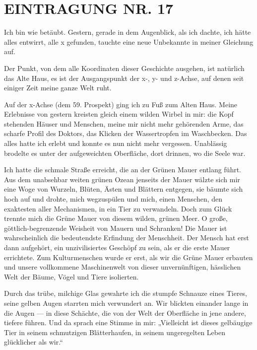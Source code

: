 \section{EINTRAGUNG NR. 17}

Ich bin wie betäubt. Gestern, gerade in dem Augenblick, als ich
dachte, ich hätte alles entwirrt, alle x gefunden, tauchte eine
neue Unbekannte in meiner Gleichung auf.

Der Punkt, von dem alle
Koordinaten dieser Geschichte ausgehen, ist natürlich das Alte
Haus, es ist der Ausgangspunkt 
der x-, y- und z-Achse, auf denen seit einiger Zeit meine
ganze Welt ruht.

Auf der x-Achse (dem 59. Prospekt) ging ich zu Fuß zum Alten Haus.
Meine Erlebnisse von gestern kreisten gleich einem wilden Wirbel in
mir: die Kopf stehenden Häuser und Menschen, meine mir nicht mehr
gehörenden Arme, das scharfe Profil des Doktors, das Klicken der
Wassertropfen im Waschbecken. Das alles hatte ich erlebt und konnte
es nun nicht mehr vergessen. Unablässig brodelte es unter der
aufgeweichten Oberfläche, dort drinnen, wo die Seele war.

Ich hatte die schmale Straße erreicht, die an der Grünen Mauer
entlang führt. Aus dem unabsehbar weiten grünen Ozean jenseits der
Mauer wälzte sich mir eine Woge von Wurzeln, Blüten, Ästen und
Blättern entgegen, sie bäumte sich hoch auf und drohte, mich
wegzuspülen und mich, einen Menschen, den exaktesten aller
Mechanismen, in ein Tier zu verwandeln. Doch zum Glück trennte mich
die Grüne Mauer von diesem wilden, grünen Meer. O große,
göttlich-begrenzende Weisheit von Mauern und Schranken! Die Mauer
ist wahrscheinlich die bedeutendste Erfindung der Menschheit. Der
Mensch hat erst dann aufgehört, ein unzivilisiertes Geschöpf zu
sein, als er die erste Mauer errichtete. Zum Kulturmenschen wurde
er erst, als wir die Grüne Mauer erbauten und unsere vollkommene
Maschinenwelt von dieser unvernünftigen, hässlichen Welt der Bäume,
Vögel und Tiere isolierten.

Durch das trübe, milchige Glas gewahrte ich die stumpfe Schnauze
eines Tieres, seine gelben Augen starrten mich verwundert an. Wir
blickten einander lange in die Augen — in diese Schächte, die von
der Welt der Oberfläche in jene andere, tiefere führen. Und da
sprach eine Stimme in mir: „Vielleicht ist dieses gelbäugige Tier
in seinem
schmutzigen Blätterhaufen, in seinem ungeregelten Leben glücklicher
als wir.“

